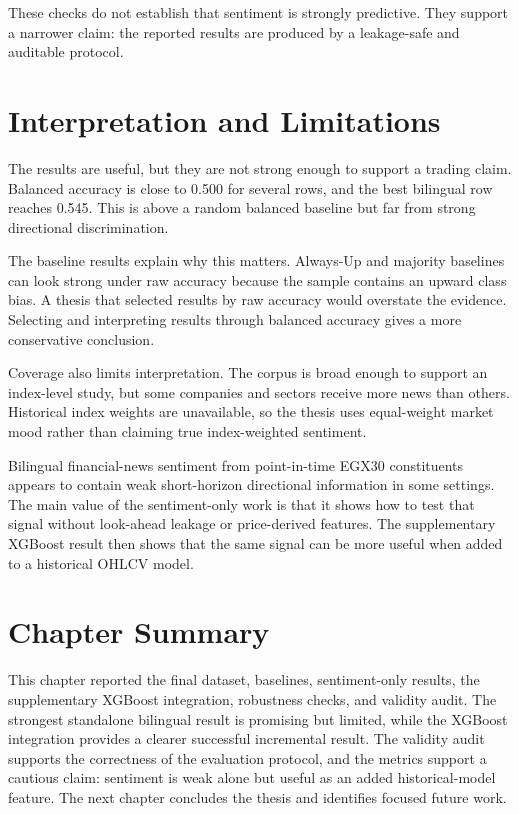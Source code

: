 These checks do not establish that sentiment is strongly predictive. They support a narrower claim: the reported results are produced by a leakage-safe and auditable protocol.

\section{Interpretation and Limitations}

The results are useful, but they are not strong enough to support a trading claim. Balanced accuracy is close to 0.500 for several rows, and the best bilingual row reaches 0.545. This is above a random balanced baseline but far from strong directional discrimination.

The baseline results explain why this matters. Always-Up and majority baselines can look strong under raw accuracy because the sample contains an upward class bias. A thesis that selected results by raw accuracy would overstate the evidence. Selecting and interpreting results through balanced accuracy gives a more conservative conclusion.

Coverage also limits interpretation. The corpus is broad enough to support an index-level study, but some companies and sectors receive more news than others. Historical index weights are unavailable, so the thesis uses equal-weight market mood rather than claiming true index-weighted sentiment.

Bilingual financial-news sentiment from point-in-time EGX30 constituents appears to contain weak short-horizon directional information in some settings. The main value of the sentiment-only work is that it shows how to test that signal without look-ahead leakage or price-derived features. The supplementary XGBoost result then shows that the same signal can be more useful when added to a historical OHLCV model.

\section{Chapter Summary}

This chapter reported the final dataset, baselines, sentiment-only results, the supplementary XGBoost integration, robustness checks, and validity audit. The strongest standalone bilingual result is promising but limited, while the XGBoost integration provides a clearer successful incremental result. The validity audit supports the correctness of the evaluation protocol, and the metrics support a cautious claim: sentiment is weak alone but useful as an added historical-model feature. The next chapter concludes the thesis and identifies focused future work.
